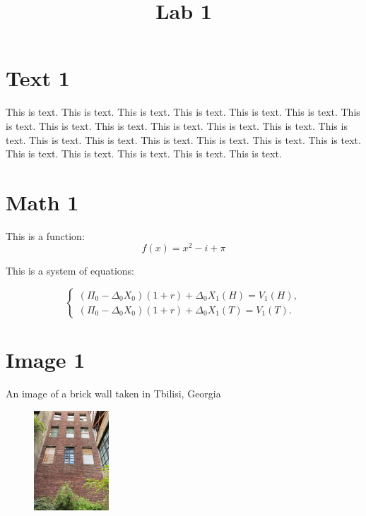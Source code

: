 \documentclass{article}
\title{Lab 1}
\begin{document}
\maketitle

\section{Text 1}

This is text. This is text. This is text. This is text. This is text. This is text. This is text. This is text. This is text. This is text. This is text. This is text. This is text. This is text. This is text. This is text. This is text. This is text. This is text. This is text.  This is text. This is text. This is text. This is text.


\section{Math 1}

This is a function:
\begin{equation}
    f(x) = x^2 - i + \pi
\end{equation}

This is a system of equations:

    \begin{equation}\label{system_eq_option_delta}
        \begin{cases}
            (\Pi_{0}-\Delta_{0}X_{0})(1+r) + \Delta_{0}X_{1}(H) = V_{1}(H),\\
            (\Pi_{0}-\Delta_{0}X_{0})(1+r) + \Delta_{0}X_{1}(T) = V_{1}(T).
        \end{cases}
    \end{equation}

\section{Image 1}


An image of a brick wall taken in Tbilisi, Georgia

\begin{figure}
    \centering
    \includegraphics[width=0.25\textwidth]{brick_wall.jpg}
\end{figure}
\end{document}
